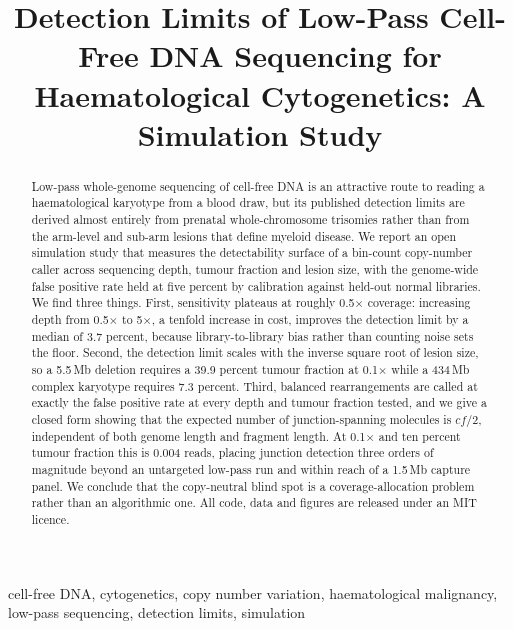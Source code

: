 \documentclass[conference]{IEEEtran}
\begin{document}
\title{Detection Limits of Low-Pass Cell-Free DNA Sequencing
for Haematological Cytogenetics: A Simulation Study}

\author{
}

\maketitle

\begin{abstract}
Low-pass whole-genome sequencing of cell-free DNA is an attractive route to
reading a haematological karyotype from a blood draw, but its published
detection limits are derived almost entirely from prenatal whole-chromosome
trisomies rather than from the arm-level and sub-arm lesions that define
myeloid disease. We report an open simulation study that measures the
detectability surface of a bin-count copy-number caller across sequencing
depth, tumour fraction and lesion size, with the genome-wide false positive
rate held at five percent by calibration against held-out normal libraries. We
find three things. First, sensitivity plateaus at roughly 0.5$\times$ coverage:
increasing depth from 0.5$\times$ to 5$\times$, a tenfold increase in cost,
improves the detection limit by a median of 3.7 percent, because library-to-library
bias rather than counting noise sets the floor. Second, the detection limit
scales with the inverse square root of lesion size, so a 5.5\,Mb deletion
requires a 39.9 percent tumour fraction at 0.1$\times$ while a 434\,Mb complex
karyotype requires 7.3 percent. Third, balanced rearrangements are called at
exactly the false positive rate at every depth and tumour fraction tested, and
we give a closed form showing that the expected number of junction-spanning
molecules is $c f / 2$, independent of both genome length and fragment length.
At 0.1$\times$ and ten percent tumour fraction this is 0.004 reads, placing
junction detection three orders of magnitude beyond an untargeted low-pass run
and within reach of a 1.5\,Mb capture panel. We conclude that the copy-neutral
blind spot is a coverage-allocation problem rather than an algorithmic one. All
code, data and figures are released under an MIT licence.
\end{abstract}

\begin{IEEEkeywords}
cell-free DNA, cytogenetics, copy number variation, haematological malignancy,
low-pass sequencing, detection limits, simulation
\end{IEEEkeywords}
\end{document}
